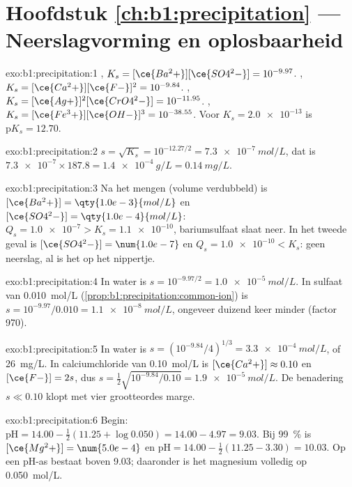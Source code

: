 \section*{Hoofdstuk \ref{ch:b1:precipitation} --- Neerslagvorming en oplosbaarheid}

\begin{solution}{exo:b1:precipitation:1}
, $K_s = [\ce{Ba^2+}][\ce{SO4^2-}] =
10^{-9.97}$. , $K_s = [\ce{Ca^2+}][\ce{F-}]^2 =
10^{-9.84}$. , $K_s =
[\ce{Ag+}]^2[\ce{CrO4^2-}] = 10^{-11.95}$. ,
$K_s = [\ce{Fe^3+}][\ce{OH-}]^3 = 10^{-38.55}$. Voor $K_s = \num{2.0e-13}$
is $\mathrm{p}K_s = 12.70$.
\end{solution}

\begin{solution}{exo:b1:precipitation:2}
$s = \sqrt{K_s} = 10^{-12.27/2} = \qty{7.3e-7}{mol/L}$, dat is
$\num{7.3e-7} \times 187.8 = \qty{1.4e-4}{g/L} = \qty{0.14}{mg/L}$.
\end{solution}

\begin{solution}{exo:b1:precipitation:3}
Na het mengen (volume verdubbeld) is $[\ce{Ba^2+}] = \qty{1.0e-3}{mol/L}$
en $[\ce{SO4^2-}] = \qty{1.0e-4}{mol/L}$: $Q_s = \num{1.0e-7} > K_s =
\num{1.1e-10}$, bariumsulfaat slaat neer. In het tweede geval is
$[\ce{SO4^2-}] = \num{1.0e-7}$ en $Q_s = \num{1.0e-10} < K_s$: geen
neerslag, al is het op het nippertje.
\end{solution}

\begin{solution}{exo:b1:precipitation:4}
In water is $s = 10^{-9.97/2} = \qty{1.0e-5}{mol/L}$. In sulfaat van
\qty{0.010}{mol/L} (\cref{prop:b1:precipitation:common-ion}) is
$s = 10^{-9.97}/0.010 =
\qty{1.1e-8}{mol/L}$, ongeveer duizend keer minder (factor 970).
\end{solution}

\begin{solution}{exo:b1:precipitation:5}
In water is $s = (10^{-9.84}/4)^{1/3} = \qty{3.3e-4}{mol/L}$, of
\qty{26}{mg/L}. In calciumchloride van \qty{0.10}{mol/L} is
$[\ce{Ca^2+}] \approx 0.10$ en $[\ce{F-}] = 2s$, dus
$s = \frac12\sqrt{10^{-9.84}/0.10} = \qty{1.9e-5}{mol/L}$. De benadering
$s \ll 0.10$ klopt met vier grootteordes marge.
\end{solution}

\begin{solution}{exo:b1:precipitation:6}
Begin: $\mathrm{pH} = 14.00 - \frac12(11.25 + \log 0.050) = 14.00 - 4.97 =
9.03$. Bij \qty{99}{\percent} is $[\ce{Mg^2+}] = \num{5.0e-4}$ en
$\mathrm{pH} = 14.00 - \frac12(11.25 - 3.30) = 10.03$. Op een pH-as
bestaat  boven 9.03; daaronder is het magnesium volledig
 op \qty{0.050}{mol/L}.
\end{solution}

